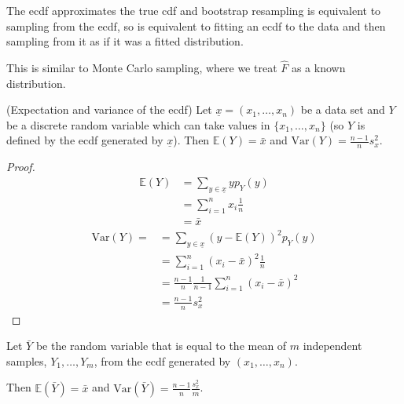 \begin{remark}
	The ecdf approximates the true cdf and bootstrap resampling is equivalent to sampling from the ecdf, so is equivalent to fitting an ecdf to the data and then sampling from it as if it was a fitted distribution.

	This is similar to Monte Carlo sampling, where we treat $\hat{F}$ as a known distribution.
\end{remark}

\begin{proposition}
	(Expectation and variance of the ecdf) Let $\underline{x} = (x_1, \dots, x_n)$ be a data set and $Y$ be a discrete random variable which can take values in $\{ x_1, \dots, x_n \}$ (so $Y$ is defined by the ecdf generated by $\underline{x}$). Then $\mathbb{E}(Y) = \bar{x}$ and $\text{Var}(Y) = \frac{n - 1}{n} s_x^2$.
\end{proposition}

\begin{proof}
	\[
		\begin{aligned}
			\mathbb{E}(Y)
				& = \sum_{y \in \underline{x}} y p_Y(y) \\
				& = \sum_{i = 1}^n x_i \frac{1}{n} \\
				& = \bar{x}
		\end{aligned}
	\]
	\[
		\begin{aligned}
			\text{Var}(Y) =
				& = \sum_{y \in \underline{x}} {(y - \mathbb{E}(Y))}^2 p_Y(y) \\
				& = \sum_{i = 1}^n {(x_i - \bar{x})}^2 \frac{1}{n} \\
				& = \frac{n - 1}{n} \frac{1}{n - 1} \sum_{i = 1}^n {(x_i - \bar{x})}^2 \\
				& = \frac{n - 1}{n} s_x^2
		\end{aligned}
	\]
\end{proof}

\begin{corollary}\label{cor:ecdfExpectationAndVariance}
	Let $\bar{Y}$ be the random variable that is equal to the mean of $m$ independent samples, $Y_1, \dots, Y_m$, from the ecdf generated by $(x_1, \dots, x_n)$.

	Then $\mathbb{E}(\bar{Y}) = \bar{x}$ and $\text{Var}(\bar{Y}) = \frac{n - 1}{n} \frac{s_x^2}{m}$.
\end{corollary}

